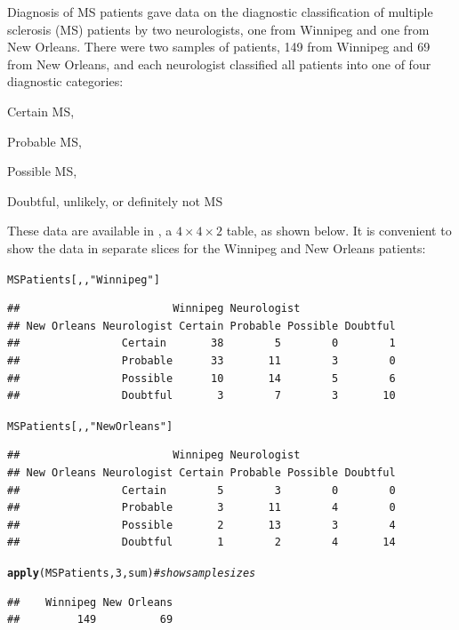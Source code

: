 \documentclass[11pt]{book}\usepackage[]{graphicx}\usepackage[]{color}
\makeatletter
\newcommand{\hlnum}[1]{\textcolor[rgb]{0.686,0.059,0.569}{#1}}%
\newcommand{\hlstr}[1]{\textcolor[rgb]{0.192,0.494,0.8}{#1}}%
\newcommand{\hlcom}[1]{\textcolor[rgb]{0.678,0.584,0.686}{\textit{#1}}}%
\newcommand{\hlstd}[1]{\textcolor[rgb]{0.345,0.345,0.345}{#1}}%
\newcommand{\hlkwd}[1]{\textcolor[rgb]{0.737,0.353,0.396}{\textbf{#1}}}%
\newenvironment{kframe}{%
 \def\at@end@of@kframe{}%
 \ifinner\ifhmode%
  \def\at@end@of@kframe{\end{minipage}}%
  \begin{minipage}{\columnwidth}%
 \fi\fi%
 \def\FrameCommand##1{\hskip\@totalleftmargin \hskip-\fboxsep
 \colorbox{shadecolor}{##1}\hskip-\fboxsep
     \hskip-\linewidth \hskip-\@totalleftmargin \hskip\columnwidth}%
 \MakeFramed {\advance\hsize-\width
   \@totalleftmargin\z@ \linewidth\hsize
   \@setminipage}}%
 {\par\unskip\endMakeFramed%
 \at@end@of@kframe}
\newenvironment{knitrout}{}{} %
\renewenvironment{knitrout}{\small\renewcommand{\baselinestretch}{.85}}{} %
\makeatother
\begin{document}
\begin{Example}[MS1]{Diagnosis of MS patients}
\citet{LandisKoch:77} gave data on the diagnostic classification
of multiple sclerosis (MS) patients by two neurologists,
one from Winnipeg and one from New Orleans.
There were two samples of patients, 149 from Winnipeg and
69 from New Orleans, and each neurologist classified
all patients
into one of four diagnostic categories:
\begin{seriate}
\item Certain MS,
\item Probable MS,
\item Possible MS,
\item Doubtful, unlikely, or definitely not MS
\end{seriate}

These data are available in ,
a $4 \times 4 \times 2$ table, as shown below.
It is convenient to show the data in separate slices for the Winnipeg
and New Orleans patients:
\begin{knitrout}
\color{fgcolor}\begin{kframe}
\begin{alltt}
\hlstd{MSPatients[,,}\hlstr{"Winnipeg"}\hlstd{]}
\end{alltt}
\begin{verbatim}
##                        Winnipeg Neurologist
## New Orleans Neurologist Certain Probable Possible Doubtful
##                Certain       38        5        0        1
##                Probable      33       11        3        0
##                Possible      10       14        5        6
##                Doubtful       3        7        3       10
\end{verbatim}
\begin{alltt}
\hlstd{MSPatients[,,}\hlstr{"New Orleans"}\hlstd{]}
\end{alltt}
\begin{verbatim}
##                        Winnipeg Neurologist
## New Orleans Neurologist Certain Probable Possible Doubtful
##                Certain        5        3        0        0
##                Probable       3       11        4        0
##                Possible       2       13        3        4
##                Doubtful       1        2        4       14
\end{verbatim}
\begin{alltt}
\hlkwd{apply}\hlstd{(MSPatients,} \hlnum{3}\hlstd{, sum)}      \hlcom{# show sample sizes}
\end{alltt}
\begin{verbatim}
##    Winnipeg New Orleans 
##         149          69
\end{verbatim}
\end{kframe}
\end{knitrout}


\end{Example}
\end{document}
